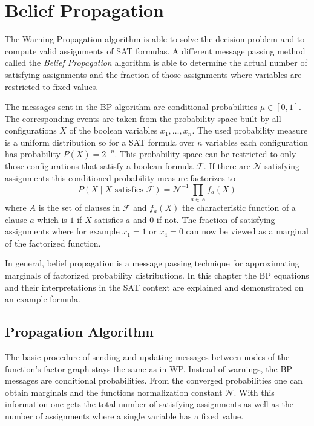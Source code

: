 \section{Belief Propagation} \label{BP}

The Warning Propagation algorithm is able to solve the decision problem and to compute valid assignments of SAT formulas. A different message passing method called the \emph{Belief Propagation} algorithm is able to determine the actual number of satisfying assignments and the fraction of those assignments where variables are restricted to fixed values. 

The messages sent in the BP algorithm are conditional probabilities $\mu \in [0, 1]$. The corresponding events are taken from the probability space built by all configurations $X$ of the  boolean variables $x_1, \ldots, x_n$. The used probability measure is a uniform distribution so for a SAT formula over $n$ variables each configuration has probability $P(X) = 2^{-n}$. \newline
This probability space can be restricted to only those configurations that satisfy a boolean formula $\mathcal{F}$. If there are $\mathcal{N}$ satisfying assignments this conditioned probability measure factorizes to $$P(X \; | \; X \text{ satisfies } \mathcal{F}) = \mathcal{N}^{-1} \prod_{a \in A} f_a(X)$$
where $A$ is the set of clauses in $\mathcal{F}$ and $f_a(X)$ the characteristic function of a clause $a$ which is $1$ if $X$ satisfies $a$ and $0$ if not. \newline
The fraction of satisfying assignments where for example $x_1 = 1$ or $x_4 = 0$ can now be viewed as a marginal of the factorized function. \newline

In general, belief propagation is a message passing technique for approximating marginals of factorized probability distributions. In this chapter the BP equations and their interpretations in the SAT context are explained and demonstrated on an example formula.

\subsection{Propagation Algorithm} \label{BPA}

The basic procedure of sending and updating messages between nodes of the function's factor graph stays the same as in WP. Instead of warnings, the BP messages are conditional probabilities. From the converged probabilities one can obtain marginals and the functions normalization constant $\mathcal{N}$. With this information one gets the total number of satisfying assignments as well as the number of assignments where a single variable has a fixed value.


